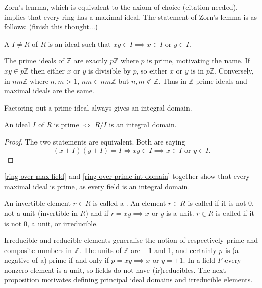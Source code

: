 \begin{remark}
Zorn's lemma, which is equivalent to the axiom of choice (citation needed), implies that every ring has a maximal ideal. The statement of Zorn's lemma is as follows: (finish this thought...)
\end{remark}

\begin{definition}
A  $I\neq R$ of $R$ is an ideal such that $xy\in I\implies x\in I$ or $y\in I$. 
\end{definition}

\begin{example}
The prime ideals of $\mathbb{Z}$ are exactly $p\mathbb{Z}$ where $p$ is prime, motivating the name. If $xy\in p\mathbb{Z}$ then either $x$ or $y$ is divisible by $p$, so either $x$ or $y$ is in $p\mathbb{Z}$. Conversely, in $nm\mathbb{Z}$ where $n,m>1$, $nm\in nm\mathbb{Z}$ but $n,m\not \in \mathbb{Z}$. Thus in $\mathbb{Z}$ prime ideals and maximal ideals are the same.
\end{example}
Factoring out a prime ideal always gives an integral domain.
\begin{lemma}\label{ring-over-prime-int-domain}
An ideal $I$ of $R$ is prime $\iff$ $R/I$ is an integral domain.
\end{lemma}
\begin{proof}
The two statements are equivalent. Both are saying
$$(x+I)(y+I)=I\iff xy\in I\implies x\in I \text{ or } y\in I.$$
\end{proof}
\begin{remark}\label{max-is-prime}
\cref{ring-over-max-field} and \cref{ring-over-prime-int-domain} together show that every maximal ideal is prime, as every field is an integral domain.
\end{remark}

\begin{definition}
An invertible element $r\in R$ is called a . An element $r\in R$ is called  if it is not 0, not a unit (invertible in $R$) and if $r=xy\implies x$ or $y$ is a unit. $r\in R$ is called  if it is not 0, a unit, or irreducible.
\end{definition}
Irreducible and reducible elements generalise the notion of respectively prime and composite numbers in $\mathbb{Z}$. The units of $\mathbb{Z}$ are $-1$ and $1$, and certainly $p$ is (a negative of a) prime if and only if $p=xy\implies x$ or $y=\pm 1$. In a field $F$ every nonzero element is a unit, so fields do not have (ir)reducibles. The next proposition motivates defining principal ideal domains and irreducible elements.

